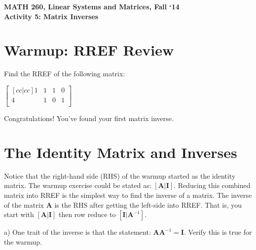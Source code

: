 \documentclass{article}
\begin{document}
\begin{flushleft}
	\bfseries{MATH 260, Linear Systems and Matrices, Fall `14}\\
	\bfseries{Activity 5:  Matrix Inverses}\\
\end{flushleft}
\begin{flushleft}

\section*{Warmup: RREF Review}

Find the RREF of the following matrix:\\
\begin{center}
$\begin{bmatrix}[cc|cc]
1 & 1 &  1 & 0 \\
4 & 1 &  0 & 1 \\

\end{bmatrix}
$\\
\end{center}
\vspace{6in}

Congratulations! You've found your first matrix inverse.

\newpage

\section{The Identity Matrix and Inverses}

Notice that the right-hand side (RHS) of the warmup started as the identity matrix. The warmup exercise could be stated as: $[\textbf{A}|\textbf{I}]$. Reducing this combined matrix into RREF is the simplest way to find the inverse of a matrix. The inverse of the matrix $\textbf{A}$ is the RHS after getting the left-side into RREF.  That is, you start with $ [\textbf{A} | \textbf{I}] $ then row reduce to $ [\textbf{I} | \textbf{A}^{-1} ] $.

\vspace{0.2in}

a) One trait of the inverse is that the statement: $\textbf{A} \textbf{A}^{-1} = \textbf{I} $. Verify this is true for the warmup.

\vspace{1.5in}


\end{flushleft}
\end{document}
